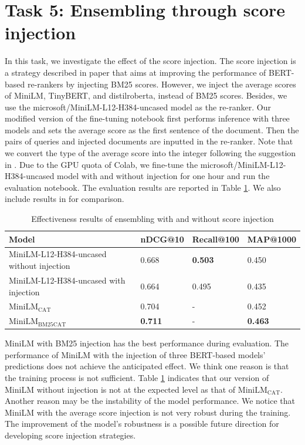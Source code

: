 \documentclass[acmsmall]{acmart}
\begin{document}
\section{Task 5: Ensembling through score injection}
In this task, we investigate the effect of the score injection. The score injection is a strategy described in paper \cite{injection} that aims at improving the performance of BERT-based re-rankers by injecting BM25 scores. However, we inject the average scores of MiniLM, TinyBERT, and distilroberta, instead of BM25 scores. Besides, we use the microsoft/MiniLM-L12-H384-uncased model as the re-ranker. Our modified version of the fine-tuning notebook first performs inference with three models and sets the average score as the first sentence of the document. Then the pairs of queries and injected documents are inputted in the re-ranker. Note that we convert the type of the average score into the integer following the suggestion in \cite{injection}. Due to the GPU quota of Colab, we fine-tune the microsoft/MiniLM-L12-H384-uncased model with and without injection for one hour and run the evaluation notebook. The evaluation results are reported in Table \ref{tab:results-task5}. We also include results in \cite{injection} for comparison.
\begin{table}[!ht]
    \centering
    \caption{Effectiveness results of ensembling with and without score injection}
    \label{tab:results-task5}
    \begin{tabular}{llll}
       \toprule
       \textbf{Model} & \textbf{nDCG@10} & \textbf{Recall@100} & \textbf{MAP@1000}\\
       \midrule
       MiniLM-L12-H384-uncased without injection & 0.668 & \textbf{0.503} & 0.450\\
       MiniLM-L12-H384-uncased with injection & 0.664 & 0.495 & 0.435\\
       $\text{MiniLM}_{\text{CAT}}$\cite{injection} & 0.704 & - & 0.452\\
       $\text{MiniLM}_{\text{BM25CAT}}$\cite{injection} & \textbf{0.711} & - & \textbf{0.463}\\
       \bottomrule
    \end{tabular}
\end{table}

MiniLM with BM25 injection has the best performance during evaluation. The performance of MiniLM with the injection of three BERT-based models' predictions does not achieve the anticipated effect. We think one reason is that the training process is not sufficient. Table \ref{tab:results-task5} indicates that our version of MiniLM without injection is not at the expected level as that of $\text{MiniLM}_{\text{CAT}}$. Another reason may be the instability of the model performance. We notice that MiniLM with the average score injection is not very robust during the training. The improvement of the model's robustness is a possible future direction for developing score injection strategies.



\end{document}
